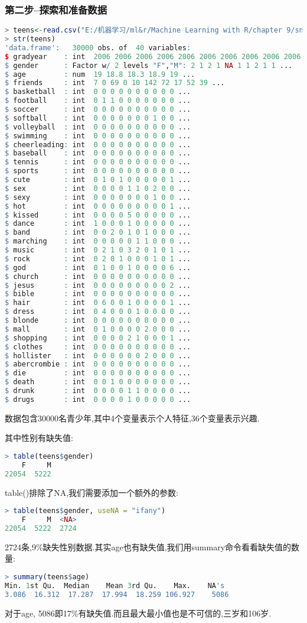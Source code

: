 \documentclass[11pt,a4paper,oneside]{book}
\begin{document}
\subsubsection{第二步--探索和准备数据}
\begin{lstlisting}[language=r]
> teens<-read.csv("E:/机器学习/ml&r/Machine Learning with R/chapter 9/snsdata.csv")
> str(teens)
'data.frame':	30000 obs. of  40 variables:
$ gradyear    : int  2006 2006 2006 2006 2006 2006 2006 2006 2006 2006 ...
$ gender      : Factor w/ 2 levels "F","M": 2 1 2 1 NA 1 1 2 1 1 ...
$ age         : num  19 18.8 18.3 18.9 19 ...
$ friends     : int  7 0 69 0 10 142 72 17 52 39 ...
$ basketball  : int  0 0 0 0 0 0 0 0 0 0 ...
$ football    : int  0 1 1 0 0 0 0 0 0 0 ...
$ soccer      : int  0 0 0 0 0 0 0 0 0 0 ...
$ softball    : int  0 0 0 0 0 0 0 1 0 0 ...
$ volleyball  : int  0 0 0 0 0 0 0 0 0 0 ...
$ swimming    : int  0 0 0 0 0 0 0 0 0 0 ...
$ cheerleading: int  0 0 0 0 0 0 0 0 0 0 ...
$ baseball    : int  0 0 0 0 0 0 0 0 0 0 ...
$ tennis      : int  0 0 0 0 0 0 0 0 0 0 ...
$ sports      : int  0 0 0 0 0 0 0 0 0 0 ...
$ cute        : int  0 1 0 1 0 0 0 0 0 1 ...
$ sex         : int  0 0 0 0 1 1 0 2 0 0 ...
$ sexy        : int  0 0 0 0 0 0 0 1 0 0 ...
$ hot         : int  0 0 0 0 0 0 0 0 0 1 ...
$ kissed      : int  0 0 0 0 5 0 0 0 0 0 ...
$ dance       : int  1 0 0 0 1 0 0 0 0 0 ...
$ band        : int  0 0 2 0 1 0 1 0 0 0 ...
$ marching    : int  0 0 0 0 0 1 1 0 0 0 ...
$ music       : int  0 2 1 0 3 2 0 1 0 1 ...
$ rock        : int  0 2 0 1 0 0 0 1 0 1 ...
$ god         : int  0 1 0 0 1 0 0 0 0 6 ...
$ church      : int  0 0 0 0 0 0 0 0 0 0 ...
$ jesus       : int  0 0 0 0 0 0 0 0 0 2 ...
$ bible       : int  0 0 0 0 0 0 0 0 0 0 ...
$ hair        : int  0 6 0 0 1 0 0 0 0 1 ...
$ dress       : int  0 4 0 0 0 1 0 0 0 0 ...
$ blonde      : int  0 0 0 0 0 0 0 0 0 0 ...
$ mall        : int  0 1 0 0 0 0 2 0 0 0 ...
$ shopping    : int  0 0 0 0 2 1 0 0 0 1 ...
$ clothes     : int  0 0 0 0 0 0 0 0 0 0 ...
$ hollister   : int  0 0 0 0 0 0 2 0 0 0 ...
$ abercrombie : int  0 0 0 0 0 0 0 0 0 0 ...
$ die         : int  0 0 0 0 0 0 0 0 0 0 ...
$ death       : int  0 0 1 0 0 0 0 0 0 0 ...
$ drunk       : int  0 0 0 0 1 1 0 0 0 0 ...
$ drugs       : int  0 0 0 0 1 0 0 0 0 0 ...
\end{lstlisting}
数据包含30000名青少年,其中4个变量表示个人特征,36个变量表示兴趣.

其中性别有缺失值:
\begin{lstlisting}[language=r]
> table(teens$gender)
    F     M 
22054  5222 
\end{lstlisting}
table()排除了NA,我们需要添加一个额外的参数:
\begin{lstlisting}[language=r]
> table(teens$gender, useNA = "ifany")
    F     M  <NA> 
22054  5222  2724 	
\end{lstlisting}
2724条,9\%缺失性别数据.其实age也有缺失值,我们用summary命令看看缺失值的数量:
\begin{lstlisting}[language=r]
> summary(teens$age)
Min. 1st Qu.  Median    Mean 3rd Qu.    Max.    NA's 
3.086  16.312  17.287  17.994  18.259 106.927    5086 
\end{lstlisting}
对于age, 5086即17\%有缺失值.而且最大最小值也是不可信的,三岁和106岁.
\end{document}
